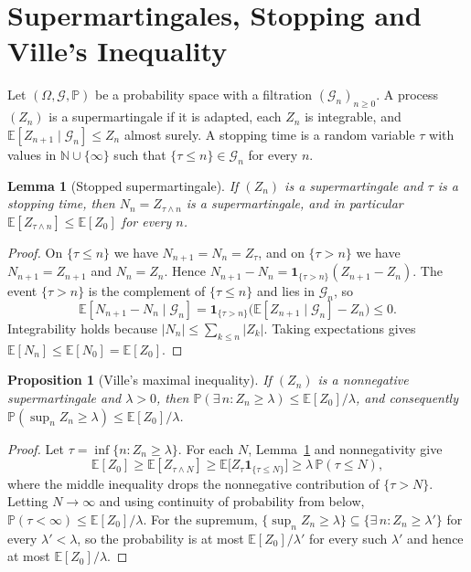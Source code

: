 \documentclass[11pt]{article}
\newtheorem{proposition}{Proposition}
\newtheorem{lemma}{Lemma}
\theoremstyle{definition}
\theoremstyle{remark}
\newcommand{\E}{\mathbb{E}}
\renewcommand{\Pr}{\mathbb{P}}
\begin{document}
\appendix

\section{Supermartingales, Stopping and Ville's Inequality}\label{app:martingale}

Let $(\Omega, \mathcal{G}, \Pr)$ be a probability space with a filtration $(\mathcal{G}_n)_{n \ge 0}$. A process $(Z_n)$ is a supermartingale if it is adapted, each $Z_n$ is integrable, and $\E[Z_{n+1} \mid \mathcal{G}_n] \le Z_n$ almost surely. A stopping time is a random variable $\tau$ with values in $\mathbb{N} \cup \{\infty\}$ such that $\{\tau \le n\} \in \mathcal{G}_n$ for every $n$.

\begin{lemma}[Stopped supermartingale]\label{lem:stopped}
If $(Z_n)$ is a supermartingale and $\tau$ is a stopping time, then $N_n = Z_{\tau \wedge n}$ is a supermartingale, and in particular $\E[Z_{\tau \wedge n}] \le \E[Z_0]$ for every $n$.
\end{lemma}

\begin{proof}
On $\{\tau \le n\}$ we have $N_{n+1} = N_n = Z_\tau$, and on $\{\tau > n\}$ we have $N_{n+1} = Z_{n+1}$ and $N_n = Z_n$. Hence $N_{n+1} - N_n = \mathbf{1}_{\{\tau > n\}}(Z_{n+1} - Z_n)$. The event $\{\tau > n\}$ is the complement of $\{\tau \le n\}$ and lies in $\mathcal{G}_n$, so
\[
\E[N_{n+1} - N_n \mid \mathcal{G}_n] = \mathbf{1}_{\{\tau > n\}}\big(\E[Z_{n+1} \mid \mathcal{G}_n] - Z_n\big) \le 0 .
\]
Integrability holds because $|N_n| \le \sum_{k \le n} |Z_k|$. Taking expectations gives $\E[N_n] \le \E[N_0] = \E[Z_0]$.
\end{proof}

\begin{proposition}[Ville's maximal inequality]\label{prop:villeapp}
If $(Z_n)$ is a nonnegative supermartingale and $\lambda > 0$, then $\Pr(\exists\, n : Z_n \ge \lambda) \le \E[Z_0]/\lambda$, and consequently $\Pr(\sup_n Z_n \ge \lambda) \le \E[Z_0]/\lambda$.
\end{proposition}

\begin{proof}
Let $\tau = \inf\{n : Z_n \ge \lambda\}$. For each $N$, Lemma~\ref{lem:stopped} and nonnegativity give
\[
\E[Z_0] \ge \E[Z_{\tau \wedge N}] \ge \E\big[Z_\tau \mathbf{1}_{\{\tau \le N\}}\big] \ge \lambda\,\Pr(\tau \le N),
\]
where the middle inequality drops the nonnegative contribution of $\{\tau > N\}$. Letting $N \to \infty$ and using continuity of probability from below, $\Pr(\tau < \infty) \le \E[Z_0]/\lambda$. For the supremum, $\{\sup_n Z_n \ge \lambda\} \subseteq \{\exists\, n : Z_n \ge \lambda'\}$ for every $\lambda' < \lambda$, so the probability is at most $\E[Z_0]/\lambda'$ for every such $\lambda'$ and hence at most $\E[Z_0]/\lambda$.
\end{proof}
\end{document}
